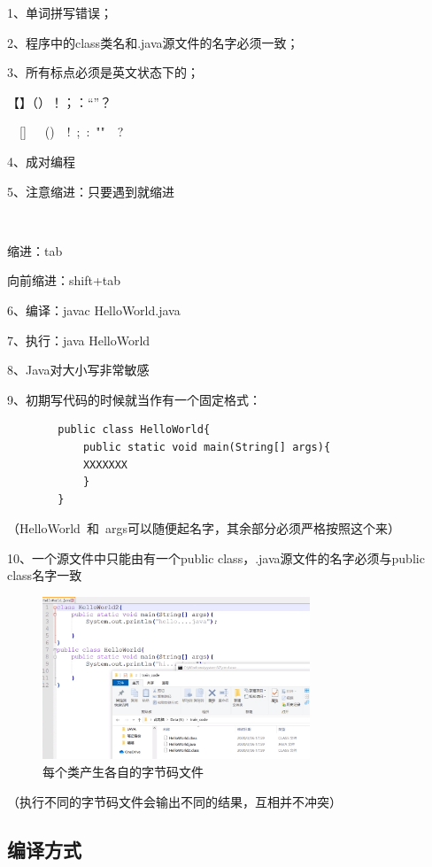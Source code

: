 \documentclass{article}
\begin{document}
	\setlength{\parindent}{2em}
	1、单词拼写错误；
	
	2、程序中的class类名和.java源文件的名字必须一致；
	
	3、所有标点必须是英文状态下的；
	
		\setlength{\parindent}{5em}【】（）{}！；：“”？
	
\ \ 	[]\ \ \ ()\ {}\ !\ ;\ :\ ""\ \ ?
	
		\setlength{\parindent}{2em}
		4、成对编程
		
		5、注意缩进：只要遇到{}就缩进
		
		\ 
		
		\setlength{\parindent}{4em}缩进：tab
		
		向前缩进：shift+tab
		
		\setlength{\parindent}{2em}
		6、编译：javac HelloWorld.java
		
		7、执行：java HelloWorld
		
		8、Java对大小写非常敏感
		
		9、初期写代码的时候就当作有一个固定格式：
		
		\begin{lstlisting}
		public class HelloWorld{
			public static void main(String[] args){
			XXXXXXX
			}
		}
		\end{lstlisting}
		
		（HelloWorld\ 和\ args可以随便起名字，其余部分必须严格按照这个来）
		
		10、一个源文件中只能由有一个public class，.java源文件的名字必须与public class名字一致

\begin{figure}[ht]
	\centering
	\includegraphics[width=80mm]{11.png}
	\caption{每个类产生各自的字节码文件}
	\label{fig:label}
\end{figure}			

		（执行不同的字节码文件会输出不同的结果，互相并不冲突）

		\subsection{编译方式}
		
\end{document}
